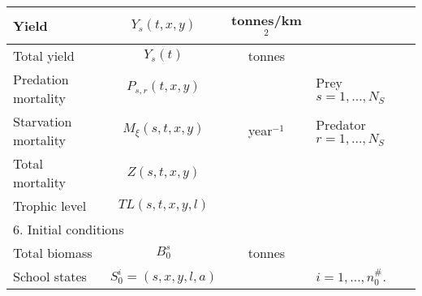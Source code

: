\documentclass[10pt,a4paper]{article}
\begin{document}
\begin{table}
\begin{tabular}{|l|c|c|p{4cm}|}
\hline Yield & $Y_s(t, x, y)$ & tonnes/km$^2$ & \\	
\hline Total yield	& $Y_s(t)$ & tonnes & \\	
\hline Predation mortality & $P_{s,r}(t, x, y)$ & & Prey $s = 1, \ldots, N_S$ \\
Starvation mortality & $M_\xi(s, t, x, y)$ & year$^{-1}$ & Predator $r = 1, \ldots, N_S$\\
Total mortality	& $Z(s, t, x, y)$ & & \\ 
\hline Trophic level & $TL(s,t,x,y,l)$ & & \\		
\hline \multicolumn{4}{|l|}{6. Initial conditions}\\
\hline Total biomass & $B_0^s$ & tonnes & \\	
\hline School states & $S_0^i = (s, x, y, l, a)$ & & $i = 1, \ldots,n_0^\#$.\\
\hline
\end{tabular} 
\end{table}
\end{document}
